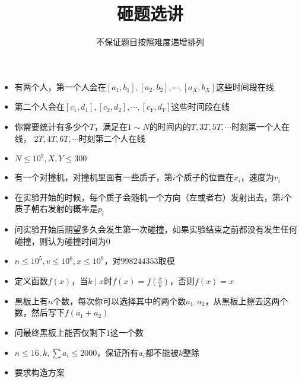 \documentclass{beamer}
\begin{document}
\begin{frame}
    \title{砸题选讲}
    \author{不保证题目按照难度递增排列}
    \begin{titlepage}
    \end{titlepage}
\end{frame}

\begin{frame}{1}
    \begin{itemize}
        \item 有两个人，第一个人会在$[a_1, b_1], [a_2, b_2], \cdots, [a_X, b_X]$这些时间段在线
        \item 第二个人会在$[c_1, d_1], [c_2, d_2], \cdots, [c_Y, d_Y]$这些时间段在线
        \item 你需要统计有多少个$T$，满足在$1\sim N$的时间内的$T, 3T, 5T,\cdots$时刻第一个人在线，
        $2T, 4T, 6T, \cdots$时刻第二个人在线
        \item $N \leq 10^9, X, Y\leq 300$
    \end{itemize}
\end{frame}

\begin{frame}{2}
    \begin{itemize}
        \item 有一个对撞机，对撞机里面有一些质子，第$i$个质子的位置在$x_i$，速度为$v_i$
        \item 在实验开始的时候，每个质子会随机一个方向（左或者右）发射出去，第$i$个质子朝右发射的概率是$p_i$
        \item 问实验开始后期望多久会发生第一次碰撞，如果实验结束之前都没有发生任何碰撞，则认为碰撞时间为$0$
        \item $n \leq 10^5, v \leq 10^6, x \leq 10^9$，对$998244353$取模
    \end{itemize}
\end{frame}

\begin{frame}{3}
    \begin{itemize}
        \item 定义函数$f(x)$，当$k \mid x$时$f(x) = f(\frac xk)$，否则$f(x) = x$
        \item 黑板上有$n$个数，每次你可以选择其中的两个数$a_1, a_2$，从黑板上擦去这两个数，然后写下$f(a_1 + a_2)$
        \item 问最终黑板上能否仅剩下$1$这一个数
        \item $n \leq 16, k, \sum a_i \leq 2000$，保证所有$a_i$都不能被$k$整除
        \item 要求构造方案
    \end{itemize}
\end{frame}
\end{document}
